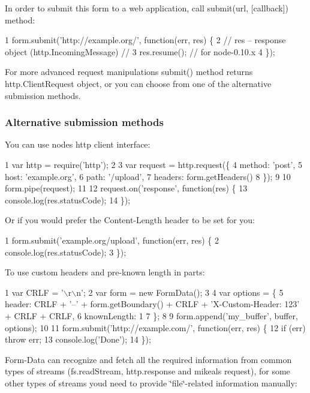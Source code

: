 In order to submit this form to a web application, call {\ttfamily submit(url, \mbox{[}callback\mbox{]})} method\+:


\begin{DoxyCode}
1 form.submit('http://example.org/', function(err, res) \{
2   // res – response object (http.IncomingMessage)  //
3   res.resume(); // for node-0.10.x
4 \});
\end{DoxyCode}


For more advanced request manipulations {\ttfamily submit()} method returns {\ttfamily http.\+Client\+Request} object, or you can choose from one of the alternative submission methods.

\subsubsection*{Alternative submission methods}

You can use node\textquotesingle{}s http client interface\+:


\begin{DoxyCode}
1 var http = require('http');
2 
3 var request = http.request(\{
4   method: 'post',
5   host: 'example.org',
6   path: '/upload',
7   headers: form.getHeaders()
8 \});
9 
10 form.pipe(request);
11 
12 request.on('response', function(res) \{
13   console.log(res.statusCode);
14 \});
\end{DoxyCode}


Or if you would prefer the {\ttfamily \textquotesingle{}Content-\/\+Length\textquotesingle{}} header to be set for you\+:


\begin{DoxyCode}
1 form.submit('example.org/upload', function(err, res) \{
2   console.log(res.statusCode);
3 \});
\end{DoxyCode}


To use custom headers and pre-\/known length in parts\+:


\begin{DoxyCode}
1 var CRLF = '\(\backslash\)r\(\backslash\)n';
2 var form = new FormData();
3 
4 var options = \{
5   header: CRLF + '--' + form.getBoundary() + CRLF + 'X-Custom-Header: 123' + CRLF + CRLF,
6   knownLength: 1
7 \};
8 
9 form.append('my\_buffer', buffer, options);
10 
11 form.submit('http://example.com/', function(err, res) \{
12   if (err) throw err;
13   console.log('Done');
14 \});
\end{DoxyCode}


Form-\/\+Data can recognize and fetch all the required information from common types of streams ({\ttfamily fs.\+read\+Stream}, {\ttfamily http.\+response} and {\ttfamily mikeal\textquotesingle{}s request}), for some other types of streams you\textquotesingle{}d need to provide \char`\"{}file\char`\"{}-\/related information manually\+:



